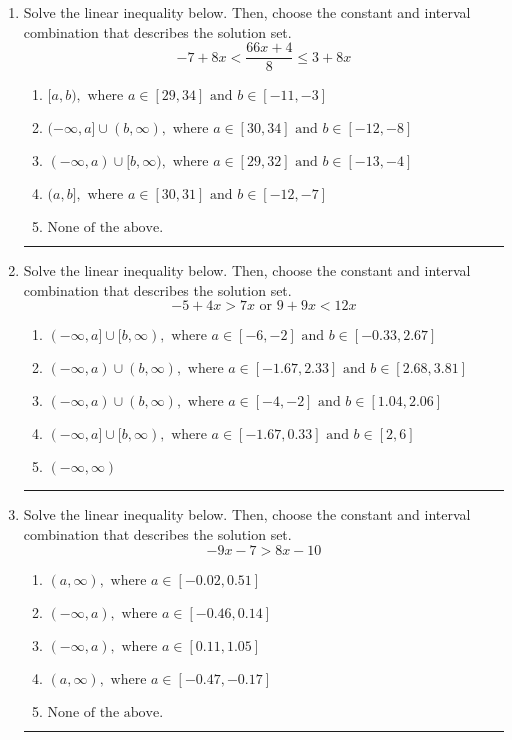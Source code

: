\documentclass[14pt]{extbook}
\newcommand{\litem}[1]{\item#1\hspace*{-1cm}\rule{\textwidth}{0.4pt}}
\begin{document}
\begin{enumerate}
{\begin{enumerate}[label=\Alph*.]
\end{enumerate} }
\litem{
Solve the linear inequality below. Then, choose the constant and interval combination that describes the solution set.\[ -7 + 8 x < \frac{66 x + 4}{8} \leq 3 + 8 x \]\begin{enumerate}[label=\Alph*.]
\item \( [a, b), \text{ where } a \in [29, 34] \text{ and } b \in [-11, -3] \)
\item \( (-\infty, a] \cup (b, \infty), \text{ where } a \in [30, 34] \text{ and } b \in [-12, -8] \)
\item \( (-\infty, a) \cup [b, \infty), \text{ where } a \in [29, 32] \text{ and } b \in [-13, -4] \)
\item \( (a, b], \text{ where } a \in [30, 31] \text{ and } b \in [-12, -7] \)
\item \( \text{None of the above.} \)

\end{enumerate} }
\litem{
Solve the linear inequality below. Then, choose the constant and interval combination that describes the solution set.\[ -5 + 4 x > 7 x \text{ or } 9 + 9 x < 12 x \]\begin{enumerate}[label=\Alph*.]
\item \( (-\infty, a] \cup [b, \infty), \text{ where } a \in [-6, -2] \text{ and } b \in [-0.33, 2.67] \)
\item \( (-\infty, a) \cup (b, \infty), \text{ where } a \in [-1.67, 2.33] \text{ and } b \in [2.68, 3.81] \)
\item \( (-\infty, a) \cup (b, \infty), \text{ where } a \in [-4, -2] \text{ and } b \in [1.04, 2.06] \)
\item \( (-\infty, a] \cup [b, \infty), \text{ where } a \in [-1.67, 0.33] \text{ and } b \in [2, 6] \)
\item \( (-\infty, \infty) \)

\end{enumerate} }
\litem{
Solve the linear inequality below. Then, choose the constant and interval combination that describes the solution set.\[ -9x -7 > 8x -10 \]\begin{enumerate}[label=\Alph*.]
\item \( (a, \infty), \text{ where } a \in [-0.02, 0.51] \)
\item \( (-\infty, a), \text{ where } a \in [-0.46, 0.14] \)
\item \( (-\infty, a), \text{ where } a \in [0.11, 1.05] \)
\item \( (a, \infty), \text{ where } a \in [-0.47, -0.17] \)
\item \( \text{None of the above}. \)

\end{enumerate} }
\end{enumerate}
\end{document}
